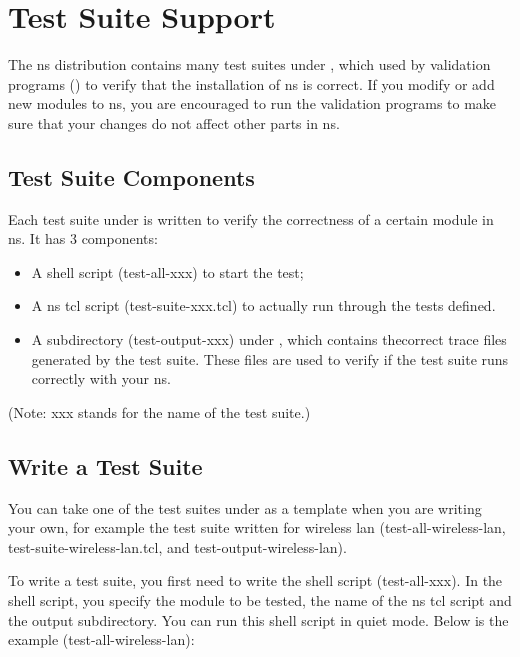 %
%
\chapter{Test Suite Support}
\label{chap:testsuite}

The ns distribution contains many test suites under , which
used by validation programs () to verify that the installation of ns is correct. If you 
modify or add new modules to ns, you are encouraged to run the validation 
programs to make sure that your changes do not affect other parts in ns. 

\section{Test Suite Components}
\label{sec:testsuitecomponents}

Each test suite under  is written to verify the correctness
of a certain module in ns. It has 3 components: 

\begin{itemize}
\item A shell script (test-all-xxx) to start the test;
\item A ns tcl script (test-suite-xxx.tcl) to actually run through the tests 
   defined.
\item A subdirectory (test-output-xxx) under , which contains 
 thecorrect trace files generated by the test suite. These files are used to 
 verify if the test suite runs correctly with your ns.
\end{itemize}

(Note: xxx stands for the name of the test suite.)

\section{Write a Test Suite}
\label{sec:writeatestsuite}

You can take one of the test suites under  as a template when
you are writing your own, for example the test suite written for wireless lan
(test-all-wireless-lan, test-suite-wireless-lan.tcl, and 
test-output-wireless-lan). 

To write a test suite, you first need to write the shell script (test-all-xxx).
In the shell script, you specify the module to be tested, the name of the ns 
tcl script and the output subdirectory. You can run this shell script in quiet 
mode. Below is the example (test-all-wireless-lan):

